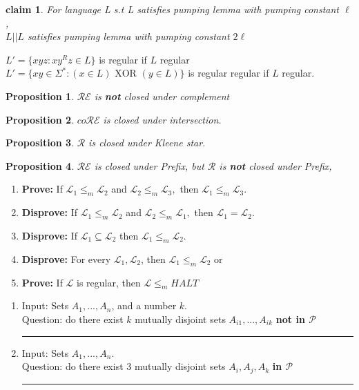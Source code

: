 \documentclass[10pt,landscape]{article}
\newtheorem*{claim*}{claim}
\newtheorem{prop}{Proposition}
\theoremstyle{plain}%
\theoremstyle{definition}
\theoremstyle{remark}
\begin{document}
\begin{multicols}{3}
  \begin{claim*}
For language L s.t L satisfies pumping lemma with pumping constant $\ell$
, \\$L||L$ satisfies pumping lemma with pumping constant  $2\ell$\end{claim*}
$L'=\lbrace xyz:xy^Rz \in L \rbrace$ is regular if $L$ regular\\
$L'=\lbrace xy  \in \Sigma^* :(x\in L) \text{ XOR } (y\in L) \rbrace$ is regular regular if $L$ regular.
\begin{prop}
$\mathcal{RE}$ is \textbf{not} closed under complement
\end{prop}
\begin{prop}  $co\mathcal{RE}$ is closed under intersection.\end{prop}
\begin{prop}  $\mathcal{R}$ is closed under Kleene star.\end{prop}
\begin{prop}  $\mathcal{RE}$ is closed under Prefix, but $\mathcal{R}$ is \textbf{not} closed under Prefix,\end{prop}
\begin{enumerate}[label=(\Alph*)]
\item \textbf{Prove:} If $\mathcal{L}_1 \leq_m \mathcal{L}_2$ and $\mathcal{L}_2 \leq_m \mathcal{L}_3, $ then $ \mathcal{L}_1 \leq_m \mathcal{L}_3.
$ 
\item \textbf{Disprove:} If $\mathcal{L}_1 \leq_m \mathcal{L}_2$ and $\mathcal{L}_2 \leq_m \mathcal{L}_1, $ then $ \mathcal{L}_1 = \mathcal{L}_2.$
\item \textbf{Disprove:} If $\mathcal{L}_1 \subseteq \mathcal{L}_2$  then $ \mathcal{L}_1 \leq_m \mathcal{L}_2.$
\item \textbf{Disprove:} For every  $\mathcal{L}_1,\mathcal{L}_2$, then $\mathcal{L}_1 \leq_m \mathcal{L}_2$ or 
\item \textbf{Prove:} If $\mathcal{L}$ is regular, then $\mathcal{L} \leq_m HALT$
\end{enumerate}

\begin{enumerate}[label=(\alph*)]
\item Input:  Sets $A_1, ..., A_n$, and a number $k$.\\ Question: do there exist $k$ mutually disjoint sets $A_{i1}
, ..., A_{ik}$
\textbf{ not in  $\mathcal{P}$}\hrule
\item Input:  Sets $A_1, ..., A_n$.\\ Question: do there exist 3 mutually disjoint sets $A_{i}
,A_{j}, A_{k}$
\textbf{ in  $\mathcal{P}$}\hrule


\end{enumerate}
\end{multicols}
\end{document}
